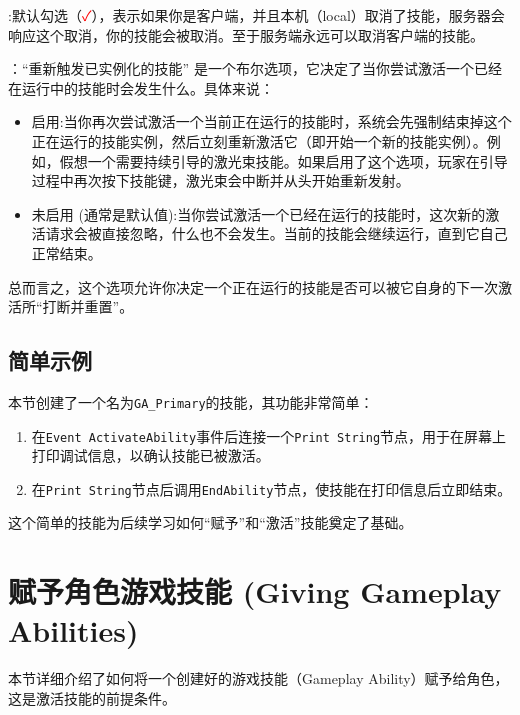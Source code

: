 \documentclass[10pt,CJKmath]{zhbook-v1}
\begin{document}
\begin{description}
    \item{}:默认勾选（\textcolor{red}{\faCheck}），表示如果你是客户端，并且本机（local）取消了技能，服务器会响应这个取消，你的技能会被取消。至于服务端永远可以取消客户端的技能。
    \item{}：“重新触发已实例化的技能” 是一个布尔选项，它决定了当你尝试激活一个已经在运行中的技能时会发生什么。具体来说：
    	\begin{itemize}
    	\item 启用:当你再次尝试激活一个当前正在运行的技能时，系统会先强制结束掉这个正在运行的技能实例，然后立刻重新激活它（即开始一个新的技能实例）。例如，假想一个需要持续引导的激光束技能。如果启用了这个选项，玩家在引导过程中再次按下技能键，激光束会中断并从头开始重新发射。
    	\item 未启用 (通常是默认值):当你尝试激活一个已经在运行的技能时，这次新的激活请求会被直接忽略，什么也不会发生。当前的技能会继续运行，直到它自己正常结束。
    	\end{itemize}
   总而言之，这个选项允许你决定一个正在运行的技能是否可以被它自身的下一次激活所“打断并重置”。
    
    
\end{description}

\subsection{简单示例}
本节创建了一个名为\texttt{GA\_Primary}的技能，其功能非常简单：
\begin{enumerate}
    \item 在\texttt{Event ActivateAbility}事件后连接一个\texttt{Print String}节点，用于在屏幕上打印调试信息，以确认技能已被激活。
    \item 在\texttt{Print String}节点后调用\texttt{EndAbility}节点，使技能在打印信息后立即结束。
\end{enumerate}
这个简单的技能为后续学习如何“赋予”和“激活”技能奠定了基础。


\section{赋予角色游戏技能 (Giving Gameplay Abilities)}
本节详细介绍了如何将一个创建好的游戏技能（Gameplay Ability）赋予给角色，这是激活技能的前提条件。
\end{document}
